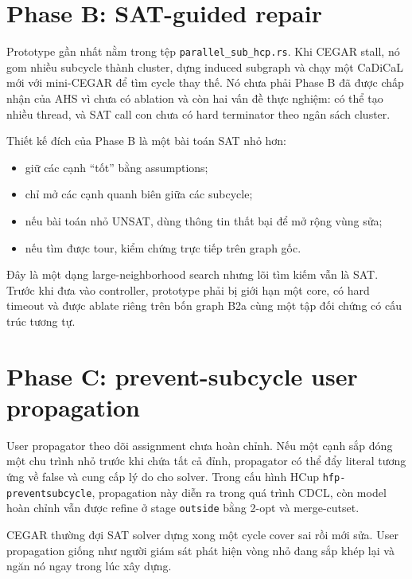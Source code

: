\documentclass[11pt,a4paper,oneside]{scrreprt}
\newcommand{\code}[1]{\texttt{#1}}
\begin{document}
\section{Phase B: SAT-guided repair}

Prototype gần nhất nằm trong tệp \code{parallel\_sub\_hcp.rs}. Khi CEGAR stall, nó gom nhiều subcycle thành cluster, dựng induced subgraph và chạy một CaDiCaL mới với mini-CEGAR để tìm cycle thay thế. Nó chưa phải Phase B đã được chấp nhận của AHS vì chưa có ablation và còn hai vấn đề thực nghiệm: có thể tạo nhiều thread, và SAT call con chưa có hard terminator theo ngân sách cluster.

Thiết kế đích của Phase B là một bài toán SAT nhỏ hơn:

\begin{itemize}
  \item giữ các cạnh ``tốt'' bằng assumptions;
  \item chỉ mở các cạnh quanh biên giữa các subcycle;
  \item nếu bài toán nhỏ UNSAT, dùng thông tin thất bại để mở rộng vùng sửa;
  \item nếu tìm được tour, kiểm chứng trực tiếp trên graph gốc.
\end{itemize}

Đây là một dạng large-neighborhood search nhưng lõi tìm kiếm vẫn là SAT. Trước khi đưa vào controller, prototype phải bị giới hạn một core, có hard timeout và được ablate riêng trên bốn graph B2a cùng một tập đối chứng có cấu trúc tương tự.

\section{Phase C: prevent-subcycle user propagation}

User propagator theo dõi assignment chưa hoàn chỉnh. Nếu một cạnh sắp đóng một chu trình nhỏ trước khi chứa tất cả đỉnh, propagator có thể đẩy literal tương ứng về false và cung cấp lý do cho solver. Trong cấu hình HCup \code{hfp-preventsubcycle}, propagation này diễn ra trong quá trình CDCL, còn model hoàn chỉnh vẫn được refine ở stage \code{outside} bằng 2-opt và merge-cutset.

\begin{intuitionbox}
CEGAR thường đợi SAT solver dựng xong một cycle cover sai rồi mới sửa. User propagation giống như người giám sát phát hiện vòng nhỏ đang sắp khép lại và ngăn nó ngay trong lúc xây dựng.
\end{intuitionbox}
\end{document}
